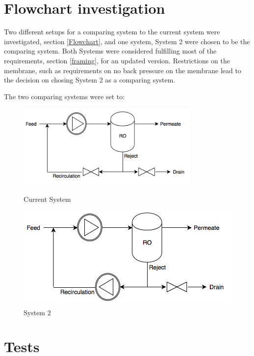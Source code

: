 

\section{Flowchart investigation}
Two different setups for a comparing system to the current system were investigated, section \ref{Flowchart}, and one system, System 2 were chosen to be the comparing system. Both Systems were considered fulfilling most of the requirements, section \ref{framing}, for an updated version. Restrictions on the membrane, such as requirements on no back pressure on the membrane lead to the decision on chosing System 2 as a comparing system. 

The two comparing systems were set to:\\
\begin{figure}[h]
\centering
\begin{minipage}{.5\textwidth}
    \centering
    \includegraphics[width=0.8\textwidth]{Sys1}
    \caption{Current System}
    \label{fig:System1}
\end{minipage}%
\begin{minipage}{.5\textwidth}
  \centering
  \includegraphics[width=.8\linewidth]{Sys2}
  \caption{System 2}
  \label{fig:System2}
\end{minipage}
\end{figure}

\section{Tests}
